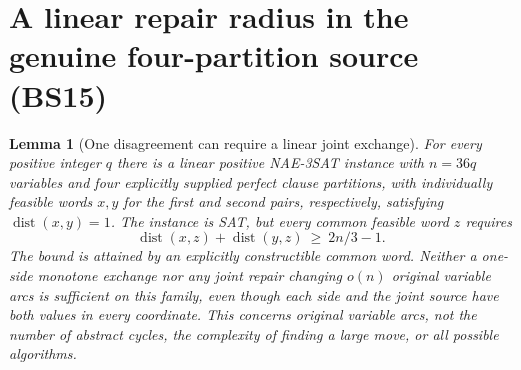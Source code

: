 \documentclass[11pt]{article}
\newtheorem{lemma}[theorem]{Lemma}
\begin{document}
\section{A linear repair radius in the genuine four-partition source (BS15)}\label{sec:bs15}
\begin{lemma}[One disagreement can require a linear joint exchange]\label{lem:bs15-radius}
For every positive integer $q$ there is a linear positive NAE-3SAT instance with $n=36q$ variables and four explicitly supplied perfect clause partitions, with individually feasible words $x,y$ for the first and second pairs, respectively, satisfying $\operatorname{dist}(x,y)=1$. The instance is SAT, but every common feasible word $z$ requires
\[
\operatorname{dist}(x,z)+\operatorname{dist}(y,z)\ \ge\ 2n/3-1.
\]
The bound is attained by an explicitly constructible common word. Neither a one-side monotone exchange nor any joint repair changing $o(n)$ original variable arcs is sufficient on this family, even though each side and the joint source have both values in every coordinate. This concerns original variable arcs, not the number of abstract cycles, the complexity of finding a large move, or all possible algorithms.
\end{lemma}
\end{document}

